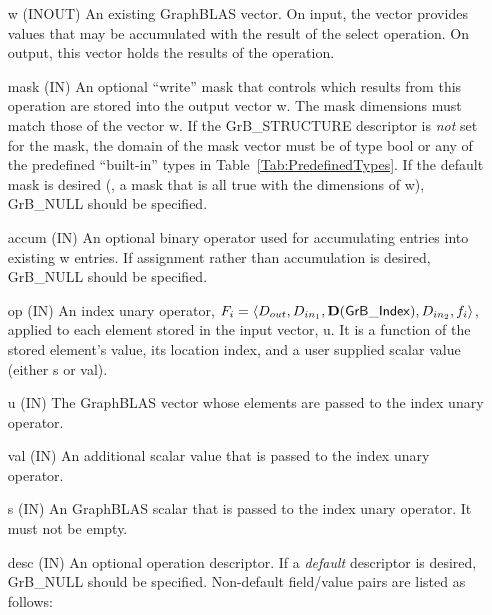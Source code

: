 \begin{itemize}[leftmargin=1.1in]
    \item[{\sf w}]    ({\sf INOUT}) An existing GraphBLAS vector.  On input,
    the vector provides values that may be accumulated with the result of the
    select operation.  On output, this vector holds the results of the
    operation.

    \item[{\sf mask}] ({\sf IN}) An optional ``write'' mask that controls which
    results from this operation are stored into the output vector {\sf w}. The 
    mask dimensions must match those of the vector {\sf w}. If the 
    {\sf GrB\_STRUCTURE} descriptor is {\em not} set for the mask, the domain of the
    {\sf mask} vector must be of type {\sf bool} or any of the predefined 
    ``built-in'' types in Table~\ref{Tab:PredefinedTypes}.  If the default
    mask is desired (\ie, a mask that is all {\sf true} with the dimensions of {\sf w}), 
    {\sf GrB\_NULL} should be specified.

    \item[{\sf accum}] ({\sf IN}) An optional binary operator used for accumulating
    entries into existing {\sf w} entries. If assignment rather than accumulation is
    desired, {\sf GrB\_NULL} should be specified.

    \item[{\sf op}] ({\sf IN}) An index unary operator, 
    $F_i = \langle \mbox{$D_{out}$}, \mbox{$D_{in_{1}}$}, \mathbf{D}({\sf GrB\_Index}), \mbox{$D_{in_{2}}$}, f_{i} \rangle$, 
    applied to each element stored in the input vector, {\sf u}. It is a function 
    of the stored element's value, its location index,
    and a user supplied scalar value (either {\sf s} or {\sf val}).

    \item[{\sf u}] ({\sf IN}) The GraphBLAS vector whose elements are passed 
    to the index unary operator.

    \item[{\sf val}] ({\sf IN}) An additional scalar value that is passed to the 
    index unary operator.

    \item[{\sf s}] ({\sf IN}) An GraphBLAS scalar that is passed to the 
    index unary operator.  It must not be empty.
    
    \item[{\sf desc}] ({\sf IN}) An optional operation descriptor. If
    a \emph{default} descriptor is desired, {\sf GrB\_NULL} should be
    specified. Non-default field/value pairs are listed as follows:  \\


\end{itemize}
